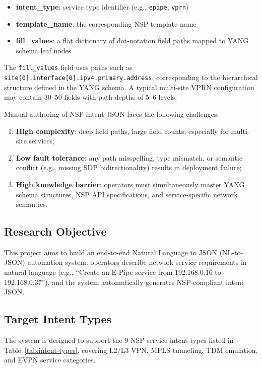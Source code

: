 \documentclass[12pt, a4paper]{article}
\newcommand{\intenttype}[1]{\texttt{#1}}
\newcommand{\yang}{\textsc{YANG}}
\newcommand{\nsp}{\textsc{NSP}}
\newcommand{\fillvalues}{\texttt{fill\_values}}
\begin{document}
\begin{itemize}
  \item \textbf{intent\_type}: service type identifier (e.g., \intenttype{epipe}, \intenttype{vprn})
  \item \textbf{template\_name}: the corresponding \nsp{} template name
  \item \textbf{fill\_values}: a flat dictionary of dot-notation field paths mapped to \yang{} schema leaf nodes
\end{itemize}

\noindent
The \fillvalues{} field uses paths such as \texttt{site[0].interface[0].ipv4.primary.address}, corresponding to the hierarchical structure defined in the \yang{} schema. A typical multi-site VPRN configuration may contain 30--50 fields with path depths of 5--6 levels.

Manual authoring of \nsp{} intent JSON faces the following challenges:

\begin{enumerate}
  \item \textbf{High complexity}: deep field paths, large field counts, especially for multi-site services;
  \item \textbf{Low fault tolerance}: any path misspelling, type mismatch, or semantic conflict (e.g., missing SDP bidirectionality) results in deployment failure;
  \item \textbf{High knowledge barrier}: operators must simultaneously master \yang{} schema structures, \nsp{} API specifications, and service-specific network semantics.
\end{enumerate}

\subsection{Research Objective}

This project aims to build an end-to-end Natural Language to JSON (NL-to-JSON) automation system: operators describe network service requirements in natural language (e.g., ``Create an E-Pipe service from 192.168.0.16 to 192.168.0.37''), and the system automatically generates \nsp{}-compliant intent JSON.

\subsection{Target Intent Types}

The system is designed to support the 9 \nsp{} service intent types listed in Table~\ref{tab:intent-types}, covering L2/L3 VPN, MPLS tunneling, TDM emulation, and EVPN service categories.
\end{document}

